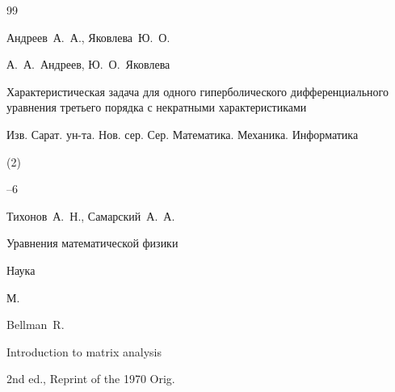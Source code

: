 \begin{thebibliography}{99}






\by Андреев~А.~А., Яковлева~Ю.~О. 

\by А.~А.~Андреев, Ю.~О.~Яковлева

\paper Характеристическая задача для одного гиперболического дифференциального уравнения третьего порядка с некратными характеристиками

\jour Изв. Сарат. ун-та. Нов. сер. Сер. Математика. Механика. Информатика



(2)

--6





\by Тихонов~А.~Н., Самарский~А.~А.

\book Уравнения математической физики


\publ Наука

\publaddr М.

















\by Bellman~R.

\book Introduction to matrix analysis

\bookinfo 2nd ed., Reprint of the 1970 Orig.


\end{thebibliography}
